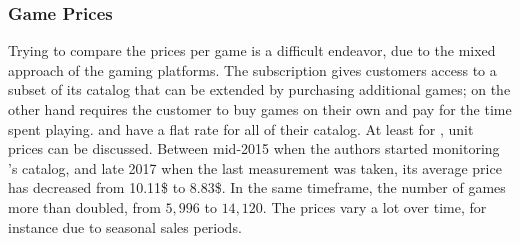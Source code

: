 \subsubsection{Game Prices}

Trying to compare the prices per game is a difficult endeavor, due to
the mixed approach of the gaming platforms. The \gfnow subscription
gives customers access to a subset of its catalog that can be
extended by purchasing additional games; \gfnowpc %
on the other hand requires the customer to buy games on their
own and pay for the
time spent playing.
\psnow and \psnowpc have a flat rate for all of their catalog.
At least for \steam, unit prices can be discussed.
Between mid-2015 when the authors started monitoring \steam's catalog,
and late 2017 when the last measurement was taken,
its average price has decreased from 10.11\$ to 8.83\$. In the same
timeframe, the number of games more than doubled, from $5,996$ to
$14,120$. The prices vary a lot over time, for instance due to
seasonal sales periods.





